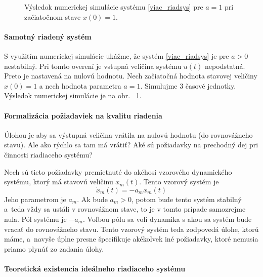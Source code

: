 \documentclass[a4paper, 10pt, ]{article}
\begin{document}



\begin{figure}[!b]
	\centering
	\caption{Výsledok numerickej simulácie systému \eqref{viac_riadsys} pre $a = 1$ pri začiatočnom stave $x(0) = 1$.}
	\label{Výsledok numerickej simulácie systému}
\end{figure}


\paragraph{Samotný riadený systém}

\noindent
S využitím numerickej simulácie ukážme, že systém \eqref{viac_riadsys} je pre $a>0$ nestabilný. Pri tomto overení je vstupná veličina systému $u(t)$ nepodstatná. Preto je nastavená na nulovú hodnotu. Nech začiatočná hodnota stavovej veličiny $x(0) = 1$ a nech hodnota parametra $a = 1$. Simulujme 3 časové jednotky. Výsledok numerickej simulácie  je na obr.~ \ref{Výsledok numerickej simulácie systému}.






\paragraph{Formalizácia požiadaviek na kvalitu riadenia}

Úlohou je aby sa výstupná veličina vrátila na nulovú hodnotu (do rovnovážneho stavu). Ale ako rýchlo sa tam má vrátiť? Aké sú požiadavky na prechodný dej pri činnosti riadiaceho systému?

Nech sú tieto požiadavky premietnuté do akéhosi vzorového dynamického systému, ktorý má stavovú veličinu $x_m(t)$. Tento vzorový systém je
\begin{equation} \label{viac_refmodel}
	\dot x_m(t) = -a_m x_m(t)
\end{equation}
Jeho parametrom je $a_m$. Ak bude $a_m > 0$, potom bude tento systém stabilný a~teda vždy sa ustáli v rovnovážnom stave, to je v tomto prípade samozrejme nula. Pól systému je $-a_m$. Voľbou pólu sa volí dynamika s akou sa systém bude vracať do rovnovážneho stavu. Tento vzorový systém teda zodpovedá úlohe, ktorú máme, a~navyše úplne presne špecifikuje akékoľvek iné požiadavky, ktoré nemusia priamo plynúť zo zadania úlohy.


\paragraph{Teoretická existencia ideálneho riadiaceho systému}
\end{document}
